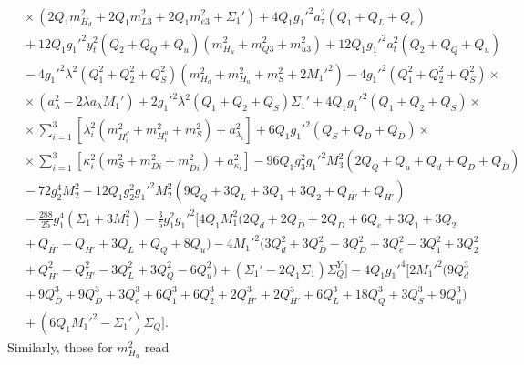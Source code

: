 \documentclass[preprint,amsmath,amssymb,aps,superscriptaddress,prd,showpacs,floatfix,nofootinbib]{revtex4-1}
\begin{document}
\begin{subequations}
\begin{align}
&{}\times\left ( 2Q_1m_{H_d}^2+2Q_1m_{L3}^2+2Q_1m_{e3}^2+\Sigma_1'\right )+4Q_1g_1'^2a_\tau^2\left ( Q_1+Q_L+Q_e\right )\nonumber\\
&{}+12Q_1g_1'^2y_t^2\left ( Q_2+Q_Q+Q_u\right )\left ( m_{H_u}^2+m_{Q3}^2+m_{u3}^2\right )+12Q_1g_1'^2a_t^2\left ( Q_2+Q_Q+Q_u\right )\nonumber\\
&{}-4g_1'^2\lambda^2\left ( Q_1^2+Q_2^2+Q_S^2\right )\left ( m_{H_d}^2+m_{H_u}^2+m_S^2+2M_1'^2\right )-4g_1'^2\left ( Q_1^2+Q_2^2+Q_S^2\right )\times\nonumber\\
&{}\times\left ( a_\lambda^2-2\lambda a_\lambda M_1'\right )+2g_1'^2\lambda^2\left ( Q_1+Q_2+Q_S\right )\Sigma_1'+4Q_1g_1'^2\left ( Q_1+Q_2+Q_S\right )\times\nonumber\\
&{}\times\sum_{i=1}^3\left [ \lambda_i^2\left ( m_{H_i^d}^2+m_{H_i^u}^2+m_S^2\right )+a_{\lambda_i}^2\right ]+6Q_1g_1'^2\left ( Q_S+Q_D+Q_{\overline{D}}\right )\times\nonumber\\
&{}\times\sum_{i=1}^3\left [ \kappa_i^2\left ( m_S^2+m_{Di}^2+m_{\overline{D}i}^2\right )+a_{\kappa_i}^2\right ]-96Q_1g_3^2g_1'^2M_3^2\left ( 2Q_Q+Q_u+Q_d+Q_D+Q_{\overline{D}}\right )\nonumber\\
&{}-72g_2^4M_2^2-12Q_1g_2^2g_1'^2M_2^2\left ( 9Q_Q+3Q_L+3Q_1+3Q_2+Q_{\overline{H'}}+Q_{H'}\right )\nonumber\\
&{}-\frac{288}{25}g_1^4\left ( \Sigma_1+3M_1^2\right )-\frac{3}{5}g_1^2g_1'^2\Big [ 4Q_1M_1^2\big ( 2Q_d+2Q_{\overline{D}}+2Q_D+6Q_e+3Q_1+3Q_2\nonumber\\
&{}+Q_{\overline{H'}}+Q_{H'}+3Q_L+Q_Q+8Q_u\big )-4M_1'^2\big ( 3Q_d^2+3Q_{\overline{D}}^2-3Q_D^2+3Q_e^2-3Q_1^2+3Q_2^2\nonumber\\
&{}+Q_{\overline{H'}}^2-Q_{H'}^2-3Q_L^2+3Q_Q^2-6Q_u^2\big )+\left ( \Sigma_1'-2Q_1\Sigma_1\right )\Sigma_Q^Y\Big ]-4Q_1g_1'^4\Big [ 2M_1'^2\big ( 9Q_d^3\nonumber\\
&{}+9Q_{\overline{D}}^3+9Q_D^3+3Q_e^3+6Q_1^3+6Q_2^3+2Q_{\overline{H'}}^3+2Q_{H'}^3+6Q_L^3+18Q_Q^3+3Q_S^3+9Q_u^3\big )\nonumber\\
&{}+\left ( 6Q_1M_1'^2-\Sigma_1'\right )\Sigma_Q\Big ].\label{eq:USSMmHd2Ot2Coeff}
\end{align}
\end{subequations}
Similarly, those for $m_{H_u}^2$ read
\end{document}

